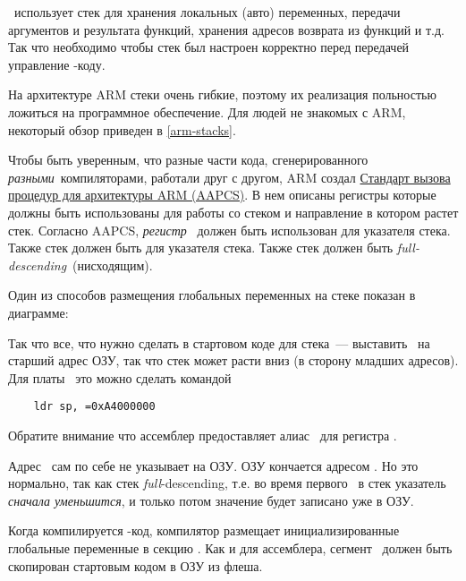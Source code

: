 
\ci\ использует стек для хранения локальных (авто) переменных, передачи
аргументов и результата функций, хранения адресов возврата из функций и т.д.
Так что  необходимо чтобы стек был настроен корректно перед передачей управление
\ci-коду.

На архитектуре ARM стеки очень гибкие, поэтому их реализация польностью ложиться
на программное обеспечение. Для людей не знакомых с ARM, некоторый обзор приведен
в \ref{arm-stacks}.

Чтобы быть уверенным, что разные части кода, сгенерированного \emph{разными}\ 
компиляторами, работали друг с другом, ARM создал 
\href{http://infocenter.arm.com/help/topic/com.arm.doc.ihi0042a/IHI0042A\_aapcs.pdf}{Стандарт
вызова процедур для архитектуры ARM (AAPCS)}. В нем описаны регистры которые 
должны быть использованы для работы со стеком и направление в котором растет
стек. Согласно AAPCS, \emph{регистр \var{r13}}\ должен быть использован для
указателя стека. Также стек должен быть для указателя стека. Также стек должен быть
\emph{full-descending}\ (нисходящим).

Один из способов размещения глобальных переменных на стеке показан в диаграмме:


Так что все, что нужно сделать в стартовом коде для стека\ --- выставить
\var{r13}\ на старший адрес ОЗУ, так что стек может расти вниз (в сторону
младших адресов).
Для платы \ это можно сделать командой  

\begin{verbatim}
	ldr sp, =0xA4000000
\end{verbatim}

Обратите внимание что ассемблер предоставляет алиас \ для регистра
\var{r13}.

\begin{framed}
Адрес \ сам по себе не указывает на ОЗУ. ОЗУ кончается адресом
\var{0xA3FFFFFF}. Но это нормально, так как стек 
\emph{full}-descending, т.е. во время первого \ в стек указатель
\emph{сначала уменьшится}, и только потом значение будет записано уже в ОЗУ.
\end{framed}


Когда компилируется \ci-код, компилятор размещает инициализированные
глобальные переменные в секцию . Как и для ассемблера, сегмент
\var{.data}\ должен быть скопирован стартовым кодом в ОЗУ из флеша.

